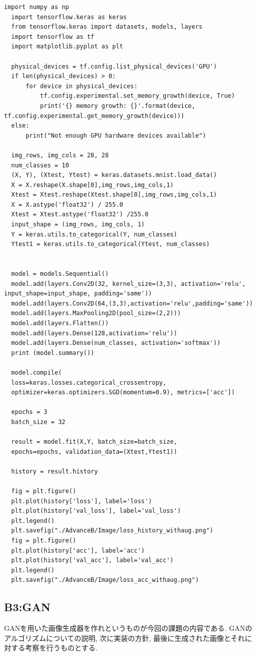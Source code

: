 \documentclass[a4paper,11pt]{jsarticle}
\begin{document}
\begin{lstlisting}[caption=check2]
  import numpy as np
  import tensorflow.keras as keras
  from tensorflow.keras import datasets, models, layers
  import tensorflow as tf
  import matplotlib.pyplot as plt

  physical_devices = tf.config.list_physical_devices('GPU')
  if len(physical_devices) > 0:
      for device in physical_devices:
          tf.config.experimental.set_memory_growth(device, True)
          print('{} memory growth: {}'.format(device, tf.config.experimental.get_memory_growth(device)))
  else:
      print("Not enough GPU hardware devices available")

  img_rows, img_cols = 28, 28
  num_classes = 10
  (X, Y), (Xtest, Ytest) = keras.datasets.mnist.load_data() 
  X = X.reshape(X.shape[0],img_rows,img_cols,1)
  Xtest = Xtest.reshape(Xtest.shape[0],img_rows,img_cols,1)
  X = X.astype('float32') / 255.0 
  Xtest = Xtest.astype('float32') /255.0
  input_shape = (img_rows, img_cols, 1)
  Y = keras.utils.to_categorical(Y, num_classes) 
  Ytest1 = keras.utils.to_categorical(Ytest, num_classes)


  model = models.Sequential()
  model.add(layers.Conv2D(32, kernel_size=(3,3), activation='relu', input_shape=input_shape, padding='same'))
  model.add(layers.Conv2D(64,(3,3),activation='relu',padding='same'))
  model.add(layers.MaxPooling2D(pool_size=(2,2)))
  model.add(layers.Flatten())
  model.add(layers.Dense(128,activation='relu'))
  model.add(layers.Dense(num_classes, activation='softmax'))
  print (model.summary()) 

  model.compile(
  loss=keras.losses.categorical_crossentropy,
  optimizer=keras.optimizers.SGD(momentum=0.9), metrics=['acc'])

  epochs = 3
  batch_size = 32

  result = model.fit(X,Y, batch_size=batch_size,
  epochs=epochs, validation_data=(Xtest,Ytest1))

  history = result.history

  fig = plt.figure()
  plt.plot(history['loss'], label='loss') 
  plt.plot(history['val_loss'], label='val_loss')
  plt.legend()
  plt.savefig("./AdvanceB/Image/loss_history_withaug.png")
  fig = plt.figure()
  plt.plot(history['acc'], label='acc') 
  plt.plot(history['val_acc'], label='val_acc')
  plt.legend()
  plt.savefig("./AdvanceB/Image/loss_acc_withaug.png") 
\end{lstlisting}

\subsection{B3:GAN}
GANを用いた画像生成器を作れというものが今回の課題の内容である.
GANのアルゴリズムについての説明, 次に実装の方針, 最後に生成された画像とそれに対する考察を行うものとする.
\end{document}
